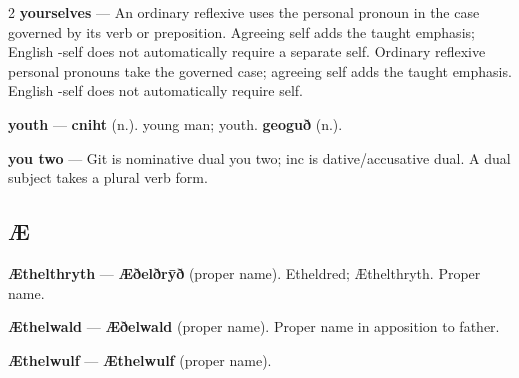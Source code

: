 \begin{multicols}{2}
\textbf{yourselves} — An ordinary reflexive uses the personal pronoun in the case governed by its verb or preposition. Agreeing self adds the taught emphasis; English -self does not automatically require a separate self. Ordinary reflexive personal pronouns take the governed case; agreeing self adds the taught emphasis. English -self does not automatically require self.\par
\textbf{youth} — \textbf{cniht} (n.). young man; youth. \textbf{geoguð} (n.).\par
\textbf{you two} — Git is nominative dual you two; inc is dative/accusative dual. A dual subject takes a plural verb form.\par
\subsection*{Æ}
\textbf{Æthelthryth} — \textbf{Æðelðrȳð} (proper name). Etheldred; Æthelthryth. Proper name.\par
\textbf{Æthelwald} — \textbf{Æðelwald} (proper name). Proper name in apposition to father.\par
\textbf{Æthelwulf} — \textbf{Æthelwulf} (proper name).\par
\end{multicols}

